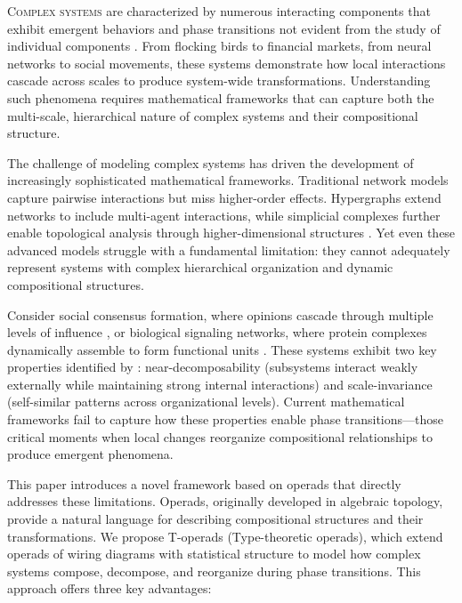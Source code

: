 \lettrine[lines=2, findent=3pt, nindent=0pt]{C}{omplex systems} are characterized by numerous interacting components that exhibit emergent behaviors and phase transitions not evident from the study of individual components \citep{mitchell2009complexity}. From flocking birds to financial markets, from neural networks to social movements, these systems demonstrate how local interactions cascade across scales to produce system-wide transformations. Understanding such phenomena requires mathematical frameworks that can capture both the multi-scale, hierarchical nature of complex systems and their compositional structure.

The challenge of modeling complex systems has driven the development of increasingly sophisticated mathematical frameworks. Traditional network models capture pairwise interactions but miss higher-order effects. Hypergraphs extend networks to include multi-agent interactions, while simplicial complexes further enable topological analysis through higher-dimensional structures \citep{battiston2020networks}. Yet even these advanced models struggle with a fundamental limitation: they cannot adequately represent systems with complex hierarchical organization and dynamic compositional structures.

Consider social consensus formation, where opinions cascade through multiple levels of influence \citep{watts1998collective}, or biological signaling networks, where protein complexes dynamically assemble to form functional units \citep{giovannoni2017dynamic}. These systems exhibit two key properties identified by \citet{simon1962architecture}: near-decomposability (subsystems interact weakly externally while maintaining strong internal interactions) and scale-invariance (self-similar patterns across organizational levels). Current mathematical frameworks fail to capture how these properties enable phase transitions—those critical moments when local changes reorganize compositional relationships to produce emergent phenomena.

This paper introduces a novel framework based on operads that directly addresses these limitations. Operads, originally developed in algebraic topology, provide a natural language for describing compositional structures and their transformations. We propose T-operads (Type-theoretic operads), which extend operads of wiring diagrams with statistical structure to model how complex systems compose, decompose, and reorganize during phase transitions. This approach offers three key advantages:

